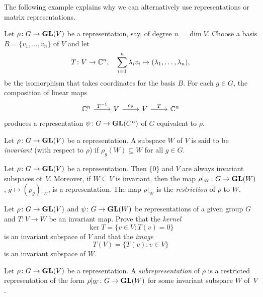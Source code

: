 The following example explains why we can alternatively use
representations or matrix representations. 

\begin{example}
\label{xca:change_of_basis}
Let $\rho\colon G\to\mathbf{GL}(V)$ be a representation, say, of degree 
$n=\dim V$. Choose a basis 
$B=\{v_1,\dots,v_n\}$ of $V$ and let 
\[
T\colon V\to\mathbb{C}^n,
\quad
\sum_{i=1}^n\lambda_iv_i\mapsto (\lambda_1,\dots,\lambda_n),
\]
be the isomorphism that takes coordinates 
for the basis $B$. For each $g\in G$, 
the composition of linear maps 
\[\begin{tikzcd}
	{\C^n} & V & V & {\C^n}
	\arrow["{T^{-1}}", from=1-1, to=1-2]
	\arrow["{\rho_g}", from=1-2, to=1-3]
	\arrow["T", from=1-3, to=1-4]
\end{tikzcd}
\]
produces a representation 
$\psi\colon G\to\mathbf{GL}(C^n)$
of $G$ equivalent to $\rho$.   
\end{example}



\begin{definition}
    Let $\rho\colon G\to\mathbf{GL}(V)$ be a representation. 
    A subspace $W$ of $V$ is said to be \emph{invariant} (with respect to $\rho$)
    if $\rho_g(W)\subseteq W$ for all $g\in G$.
\end{definition}

Let $\rho\colon G\to\mathbf{GL}(V)$ be a representation. Then $\{0\}$ and $V$ are always   
invariant subspaces of~$V$. Moreover, if $W\subseteq V$ is invariant, then
the map $\rho|_W\colon G\to\mathbf{GL}(W)$, $g\mapsto (\rho_g)|_W$, is a representation. The
map $\rho|_W$ is the \emph{restriction} of $\rho$ to $W$. 

\begin{exercise}
	Let $\rho\colon G\to\mathbf{GL}(V)$ and $\psi\colon G\to\mathbf{GL}(W)$ be representations of a given group $G$ 
	and 
 $T\colon V\to W$ be an invariant map. Prove that the \emph{kernel} 
	\[
	\ker T=\{v\in V:T(v)=0\}
	\]
	is an invariant subspace of $V$ and that the \emph{image} 
	\[
		T(V)=\{T(v):v\in V\}
	\]
	is an invariant subspace of $W$. 
\end{exercise}


\begin{definition}
    Let $\rho\colon G\to\mathbf{GL}(V)$
    be a representation. A \emph{subrepresentation} of $\rho$ is a restricted representation 
    of the form $\rho|_W\colon G\to\mathbf{GL}(W)$ for some invariant subspace $W$ of~$V$.
\end{definition}

